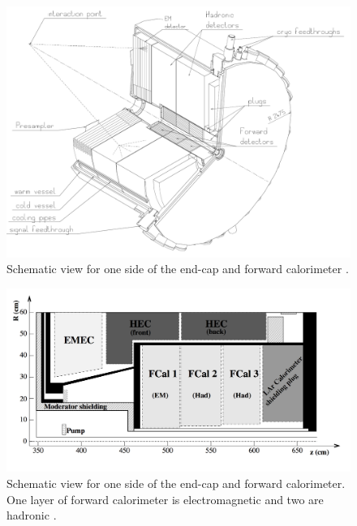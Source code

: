 \begin{figure}
\centering
\includegraphics[width=\textwidth]{data/photo/detector/endcap1.png}
\caption{Schematic view for one side of the end-cap and forward calorimeter \cite{calorimeter}.}
\label{fig:calorimeter_endcap1}
\end{figure}

\begin{figure}
\centering
\includegraphics[width=\textwidth]{data/photo/detector/endcap2.png}
\caption{Schematic view for one side of the end-cap and forward calorimeter. One layer of forward calorimeter is electromagnetic and two are hadronic \cite{ATLAS_doc}.}
\label{fig:calorimeter_endcap2}
\end{figure}

